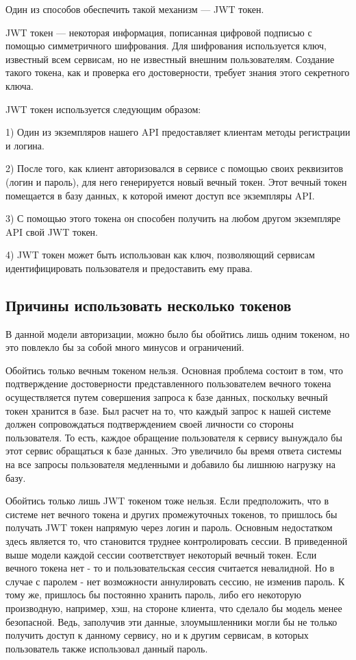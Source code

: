 \documentclass[14pt]{extarticle}
\begin{document}
    Один из способов обеспечить такой механизм --- JWT токен. \cite{jwt}

    JWT токен --- некоторая информация, пописанная цифровой подписью с помощью симметричного шифрования.
    Для шифрования используется ключ, известный всем сервисам, но не известный внешним пользователям.
    Создание такого токена, как и проверка его
    достоверности, требует знания этого секретного ключа.

    JWT токен используется следующим образом:

    1) Один из экземпляров нашего API предоставляет клиентам методы регистрации и логина.

    2) После того, как клиент авторизовался в сервисе с помощью своих реквизитов (логин и пароль), для него генерируется новый вечный токен.
    Этот вечный токен помещается в базу данных, к которой имеют доступ все экземпляры API.

    3) С помощью этого токена он способен получить на любом другом экземпляре API свой JWT токен.

    4) JWT токен может быть использован как ключ, позволяющий сервисам идентифицировать пользователя и предоставить ему права.

    \subsection*{Причины использовать несколько токенов}

    В данной модели авторизации, можно было бы обойтись лишь одним токеном, но это
    повлекло бы за
    собой много минусов и ограничений.

    Обойтись только вечным токеном нельзя. Основная проблема состоит в том, что подтверждение достоверности представленного пользователем вечного токена
    осуществляется путем совершения запроса к базе данных, поскольку вечный токен хранится в базе.
    Был расчет на то, что каждый запрос к нашей системе
    должен сопровождаться подтверждением своей личности со стороны пользователя. То есть, каждое обращение
    пользователя к сервису вынуждало бы этот сервис обращаться к базе данных. Это увеличило бы время ответа системы на все
    запросы пользователя
    медленными и добавило бы лишнюю нагрузку на базу.

    Обойтись только лишь JWT токеном тоже нельзя. Если предположить, что в системе нет вечного токена и других промежуточных токенов, то пришлось бы получать JWT токен
    напрямую через логин и пароль. Основным недостатком здесь является то, что становится труднее контролировать сессии.
    В приведенной выше модели каждой сессии соответствует некоторый вечный токен. Если вечного токена нет - то и пользовательская
    сессия считается невалидной. Но в случае с паролем - нет возможности аннулировать сессию, не изменив пароль.
    К тому же, пришлось бы постоянно хранить пароль, либо его некоторую производную, например, хэш, на стороне клиента,
    что сделало бы модель менее безопасной. Ведь, заполучив эти данные, злоумышленники могли бы не только получить доступ
    к данному сервису, но и к другим сервисам, в которых пользователь также использовал данный пароль.
\end{document}
